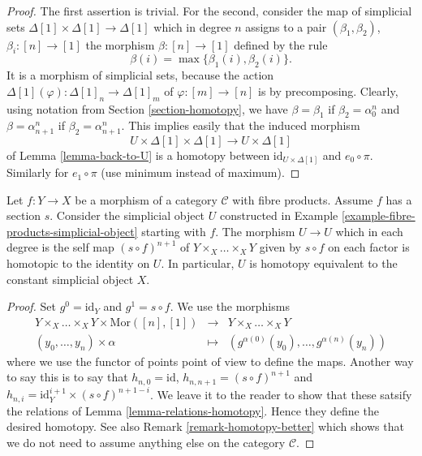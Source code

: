 \begin{proof}
The first assertion is trivial.
For the second, consider the map
of simplicial sets
$\Delta[1] \times \Delta[1] \longrightarrow \Delta[1]$
which in degree $n$ assigns to a pair $(\beta_1, \beta_2)$,
$\beta_i : [n] \to [1]$ the morphism
$\beta : [n] \to [1]$ defined by the rule
$$
\beta(i) = \max\{\beta_1(i), \beta_2(i)\}.
$$
It is a morphism of simplicial sets, because the action
$\Delta[1](\varphi) : \Delta[1]_n \to \Delta[1]_m$
of $\varphi : [m] \to [n]$ is by precomposing.
Clearly, using notation from Section \ref{section-homotopy},
we have $\beta = \beta_1$ if $\beta_2 = \alpha^n_0$
and $\beta = \alpha^n_{n + 1}$ if $\beta_2 = \alpha^n_{n + 1}$.
This implies easily that the induced morphism
$$
U \times \Delta[1] \times \Delta[1]
\longrightarrow
U \times \Delta[1]
$$
of Lemma \ref{lemma-back-to-U}
is a homotopy between $\text{id}_{U \times \Delta[1]}$ and $e_0 \circ \pi$.
Similarly for $e_1 \circ \pi$ (use minimum instead of maximum).
\end{proof}

\begin{lemma}
\label{lemma-fibre-products-simplicial-object-w-section}
Let $f : Y \to X$ be a morphism of a category $\mathcal{C}$ with
fibre products. Assume $f$ has a section $s$. Consider the
simplicial object $U$ constructed in
Example \ref{example-fibre-products-simplicial-object}
starting with $f$. The morphism $U \to U$ which in each degree
is the self map $(s \circ f)^{n + 1}$ of $Y \times_X \ldots \times_X Y$
given by $s \circ f$ on each factor is homotopic to the identity on $U$.
In particular, $U$ is homotopy equivalent to the constant
simplicial object $X$.
\end{lemma}

\begin{proof}
Set $g^0 = \text{id}_Y$ and $g^1 = s \circ f$.
We use the morphisms
\begin{eqnarray*}
Y \times_X \ldots \times_X Y \times \text{Mor}([n], [1])
& \to &
Y \times_X \ldots \times_X Y \\
(y_0, \ldots, y_n) \times \alpha
& \mapsto &
(g^{\alpha(0)}(y_0), \ldots, g^{\alpha(n)}(y_n))
\end{eqnarray*}
where we use the functor of points point of view to define the maps.
Another way to say this is to say that
$h_{n, 0} = \text{id}$, $h_{n, n + 1} = (s \circ f)^{n + 1}$ and
$h_{n, i} = \text{id}_Y^{i + 1} \times (s \circ f)^{n + 1 - i}$.
We leave it to the reader to show that these satsify the relations
of Lemma \ref{lemma-relations-homotopy}. Hence they define
the desired homotopy. See also Remark \ref{remark-homotopy-better}
which shows that
we do not need to assume anything else on the category $\mathcal{C}$.
\end{proof}


